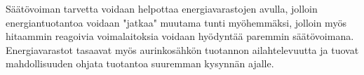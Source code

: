   Säätövoiman tarvetta voidaan helpottaa energiavarastojen avulla, jolloin energiantuotantoa voidaan "jatkaa" muutama tunti myöhemmäksi, jolloin myös hitaammin reagoivia voimalaitoksia voidaan hyödyntää paremmin säätövoimana. Energiavarastot tasaavat myös aurinkosähkön tuotannon ailahtelevuutta ja tuovat mahdollisuuden ohjata tuotantoa suuremman kysynnän ajalle.
